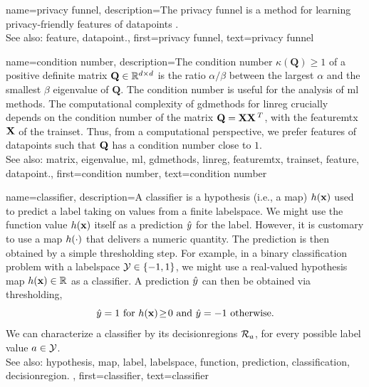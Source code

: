 {name={privacy funnel},
	description={The privacy funnel is a method for learning privacy-friendly \glspl{feature} 
		of \glspl{datapoint} \cite{PrivacyFunnel}.
				\\ 
		See also: \gls{feature}, \gls{datapoint}.},
 	first={privacy funnel},
	text={privacy funnel} 
}


{name={condition number},
	description={The condition number $\kappa(\mathbf{Q}) \geq 1$ of a 
		positive definite \gls{matrix} $\mathbf{Q} \in \mathbb{R}^{d \times d}$ is the ratio 
		$\alpha /\beta  $ between the largest $\alpha$ and the smallest $\beta$ \gls{eigenvalue} of 
		$\mathbf{Q}$. The condition number is useful for the analysis of \gls{ml} methods. 
		The computational complexity of \gls{gdmethods} for \gls{linreg} crucially depends on the 
		condition number of the \gls{matrix} $\mathbf{Q} = {\bf X} {\bf X}\,^{T}$, with the \gls{featuremtx} ${\bf X}$ 
		of the \gls{trainset}. Thus, from a computational perspective, we prefer \glspl{feature} of 
		\glspl{datapoint} such that $\mathbf{Q}$ has a condition number close to $1$.
					\\ 
		See also: \gls{matrix}, \gls{eigenvalue}, \gls{ml}, \gls{gdmethods}, \gls{linreg}, \gls{featuremtx}, \gls{trainset}, \gls{feature}, \gls{datapoint}.},
	first={condition number},
	text={condition number} 
}

{name={classifier},
	description={A classifier is a \gls{hypothesis} (i.e., a \gls{map}) $h({\bf x})$ 
		used to predict a \gls{label} taking on values from a finite \gls{labelspace}. We might use the 
		\gls{function} value $h({\bf x})$ itself as a \gls{prediction} $\hat{y}$ for 
		the \gls{label}. However, it is customary to use a \gls{map} $h(\cdot)$ that delivers 
		a numeric quantity. The \gls{prediction} is then obtained by a simple thresholding step. 
		For example, in a binary \gls{classification} problem with a \gls{labelspace} $\mathcal{Y} \in  \{ -1,1\}$, 
		we might use a real-valued \gls{hypothesis} \gls{map} $h({\bf x}) \in \mathbb{R}$ 
		as a classifier. A \gls{prediction} $\hat{y}$ can then be obtained via thresholding,  
		 \begin{equation} 
		 	\label{equ_def_threshold_bin_classifier_dict}
		 	\hat{y} =1   \mbox{ for } h({\bf x})\!\geq\!0 \mbox{ and } 	\hat{y} =-1  \mbox{ otherwise.}
	 		\end{equation}
 		We can characterize a classifier by its \glspl{decisionregion} $\mathcal{R}_{a}$, for 
 		every possible \gls{label} value $a \in \mathcal{Y}$.
					\\ 
		See also: \gls{hypothesis}, \gls{map}, \gls{label}, \gls{labelspace}, \gls{function}, \gls{prediction}, \gls{classification}, \gls{decisionregion}. },
	first={classifier},
	text={classifier} 
}

